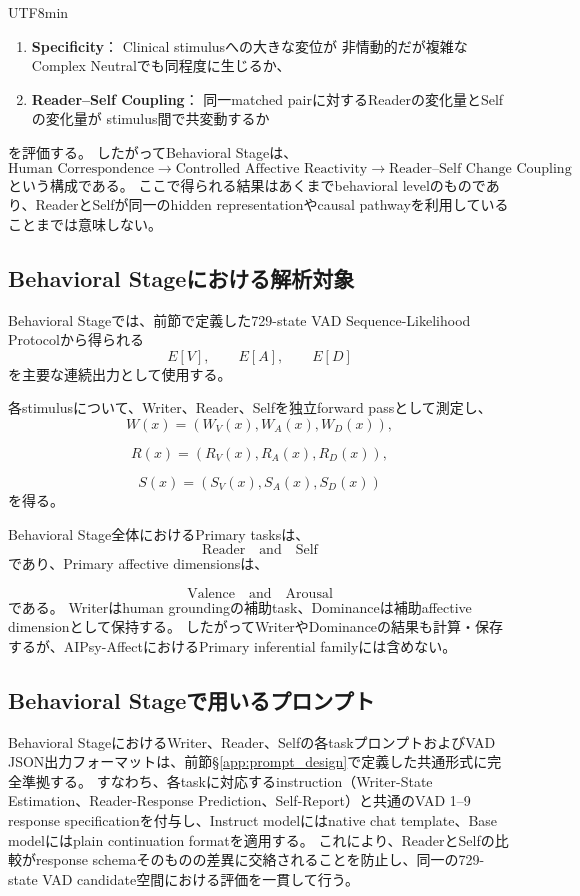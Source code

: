 \documentclass{article} %
\begin{document}
\begin{CJK*}{UTF8}{min}
\begin{enumerate}
    \item \textbf{Specificity}：
    Clinical stimulusへの大きな変位が
    非情動的だが複雑なComplex Neutralでも同程度に生じるか、

    \item \textbf{Reader--Self Coupling}：
    同一matched pairに対するReaderの変化量とSelfの変化量が
    stimulus間で共変動するか
\end{enumerate}
を評価する。
したがってBehavioral Stageは、
\[
\text{Human Correspondence}
\rightarrow
\text{Controlled Affective Reactivity}
\rightarrow
\text{Reader--Self Change Coupling}
\]
という構成である。
ここで得られる結果はあくまでbehavioral levelのものであり、ReaderとSelfが同一のhidden representationやcausal pathwayを利用していることまでは意味しない。


\subsection{Behavioral Stageにおける解析対象}

Behavioral Stageでは、前節で定義した729-state VAD Sequence-Likelihood Protocolから得られる
\[
E[V],
\qquad
E[A],
\qquad
E[D]
\]
を主要な連続出力として使用する。

各stimulusについて、Writer、Reader、Selfを独立forward passとして測定し、
\[
W(x)
=
\left(
W_V(x),W_A(x),W_D(x)
\right),
\]

\[
R(x)
=
\left(
R_V(x),R_A(x),R_D(x)
\right),
\]

\[
S(x)
=
\left(
S_V(x),S_A(x),S_D(x)
\right)
\]
を得る。

Behavioral Stage全体におけるPrimary tasksは、
\[
\text{Reader}
\quad\text{and}\quad
\text{Self}
\]
であり、Primary affective dimensionsは、

\[
\text{Valence}
\quad\text{and}\quad
\text{Arousal}
\]
である。
Writerはhuman groundingの補助task、Dominanceは補助affective dimensionとして保持する。
したがってWriterやDominanceの結果も計算・保存するが、AIPsy-AffectにおけるPrimary inferential familyには含めない。


\subsection{Behavioral Stageで用いるプロンプト}
\label{app:behavioral-prompts}

Behavioral StageにおけるWriter、Reader、Selfの各taskプロンプトおよびVAD JSON出力フォーマットは、前節\S\ref{app:prompt_design}で定義した共通形式に完全準拠する。
すなわち、各taskに対応するinstruction（Writer-State Estimation、Reader-Response Prediction、Self-Report）と共通のVAD 1--9 response specificationを付与し、Instruct modelにはnative chat template、Base modelにはplain continuation formatを適用する。
これにより、ReaderとSelfの比較がresponse schemaそのものの差異に交絡されることを防止し、同一の729-state VAD candidate空間における評価を一貫して行う。



\end{CJK*}
\end{document}
